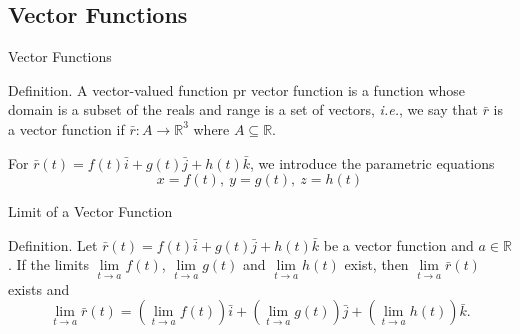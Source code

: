 \documentclass[aspectratio=169, UTF8]{ctexbeamer}
\begin{document}
    \subsection{Vector Functions}
    \begin{frame}[t]{Vector Functions}
        \begin{block}
            \par \textcolor{yy}{Definition.} A \textcolor{yy}{vector-valued function} pr \textcolor{yy}{vector function} is a function whose domain is a subset of the reals and range is a set of vectors, \textit{i.e.}, we say that $\bar{r}$ is a \textcolor{yy}{vector function} if $\bar{r}: A \to \mathbb{R}^3$ where $A \subseteq \mathbb{R}$.
        \end{block}

        \phantom{zjy}
        
        \par For $\bar{r} (t) = f(t) \bar{i} + g(t) \bar{j} + h(t) \bar{k}$, we introduce the parametric equations 
        \begin{equation*}
            x = f(t),\ y = g(t),\ z = h(t) 
        \end{equation*}

        \begin{block}{Limit of a Vector Function}
            \par \textcolor{yy}{Definition.} Let $\bar{r}(t) = f(t) \bar{i} + g(t) \bar{j} + h(t) \bar{k}$ be a vector function and $a \in \mathbb{R}$. If the limits $\lim\limits_{t \to a}f(t)$, $\lim\limits_{t \to a}g(t)$ and $\lim\limits_{t \to a}h(t)$ exist, then $\lim\limits_{t \to a} \bar{r} (t)$ exists and 
            \begin{equation*}
                \lim _{t \rightarrow a} \bar{r}(t)=\left(\lim _{t \rightarrow a} f(t)\right) \bar{i}+\left(\lim _{t \rightarrow a} g(t)\right) \bar{j}+\left(\lim _{t \rightarrow a} h(t)\right) \bar{k} .
            \end{equation*}
        \end{block}
    \end{frame}
\end{document}
